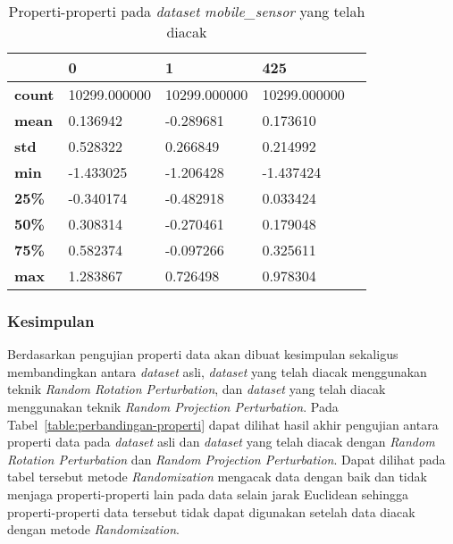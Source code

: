 \begin{table}
	\centering
	\caption{Properti-properti pada \textit{dataset} \textit{mobile\_sensor} yang telah diacak}
	\begin{tabular}{l|llll}
		\hline
		&\textbf{0}&\textbf{1}&\textbf{425}&\\ \hline
		\textbf{count}&10299.000000&10299.000000&10299.000000\\
		\textbf{mean}&0.136942&-0.289681&0.173610\\
		\textbf{std}&0.528322&0.266849&0.214992\\
		\textbf{min}&-1.433025&-1.206428&-1.437424\\
		\textbf{25\%}&-0.340174&-0.482918&0.033424\\
		\textbf{50\%}&0.308314&-0.270461&0.179048\\
		\textbf{75\%}&0.582374&-0.097266&0.325611\\
		\textbf{max}&1.283867&0.726498&0.978304\\
		\hline
	\end{tabular}
	\label{table:properti-mobile-sensor-diacak}
\end{table}

\subsubsection{Kesimpulan}
\label{subsubsec:pengujian-properti-kesimpulan}

Berdasarkan pengujian properti data akan dibuat kesimpulan sekaligus membandingkan antara \textit{dataset} asli, \textit{dataset} yang telah diacak menggunakan teknik \textit{Random Rotation Perturbation}, dan \textit{dataset} yang telah diacak menggunakan teknik \textit{Random Projection Perturbation}. Pada Tabel~\ref{table:perbandingan-properti} dapat dilihat hasil akhir pengujian antara properti data pada \textit{dataset} asli dan \textit{dataset} yang telah diacak dengan \textit{Random Rotation Perturbation} dan \textit{Random Projection Perturbation}. Dapat dilihat pada tabel tersebut metode \textit{Randomization} mengacak data dengan baik dan tidak menjaga properti-properti lain pada data selain jarak Euclidean sehingga properti-properti data tersebut tidak dapat digunakan setelah data diacak dengan metode \textit{Randomization}.

